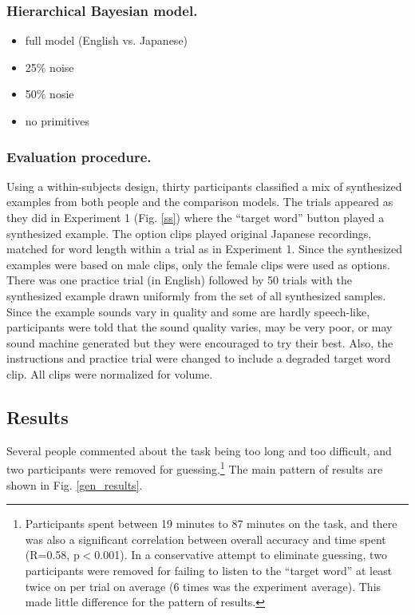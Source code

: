 \documentclass[10pt,letterpaper]{article}
\begin{document}
\subsubsection{Hierarchical Bayesian model.}

\begin{itemize}
\item full model (English vs. Japanese)
\item 25\% noise
\item 50\% nosie
\item no primitives
\end{itemize}

\subsubsection{Evaluation procedure.} 
Using a within-subjects design, thirty participants classified a mix of synthesized examples from both people and the comparison models. The trials appeared as they did in Experiment 1 (Fig. \ref{ss}) where the ``target word'' button played a synthesized example. The option clips played original Japanese recordings, matched for word length within a trial as in Experiment 1. Since the synthesized examples were based on male clips, only the female clips were used as options. There was one practice trial (in English) followed by 50 trials with the synthesized example drawn uniformly from the set of all synthesized samples. Since the example sounds vary in quality and some are hardly speech-like, participants were told that the sound quality varies, may be very poor, or may sound machine generated but they were encouraged to try their best. Also, the instructions and practice trial were changed to include a degraded target word clip. All clips were normalized for volume.

\subsection{Results}
Several people commented about the task being too long and too difficult, and two participants were removed for guessing.\footnote{Participants spent between 19 minutes to 87 minutes on the task, and there was also a significant correlation between overall accuracy and time spent (R=0.58, p$<$0.001). In a conservative attempt to eliminate guessing, two participants were removed for failing to listen to the ``target word'' at least twice on per trial on average (6 times was the experiment average). This made little difference for the pattern of results.} The main pattern of results are shown in Fig. \ref{gen_results}. 
\end{document}
